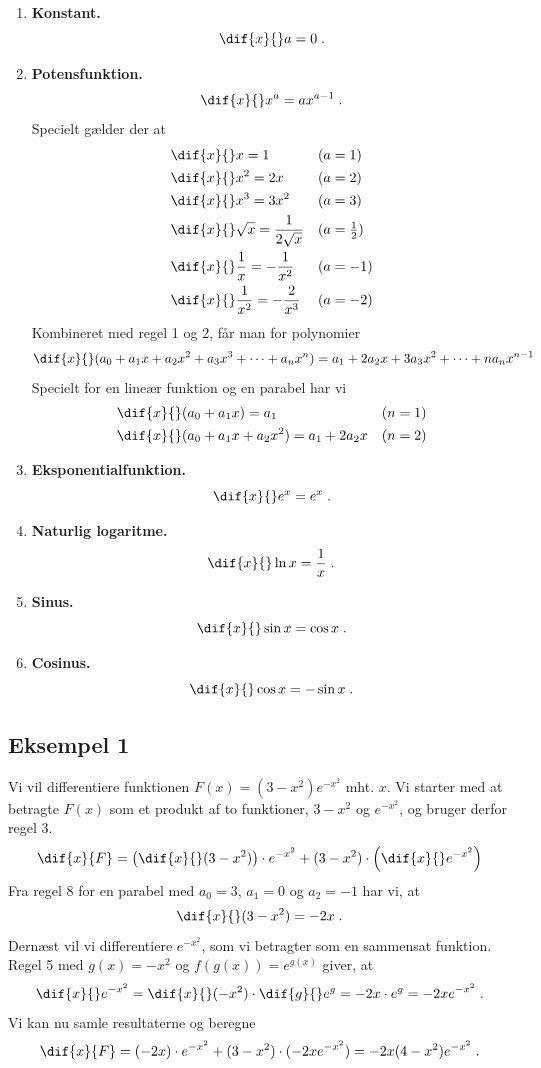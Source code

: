 \begin{enumerate}[resume]
	\item\label{itm:d-konstant} \textbf{Konstant.}\\
	\[
	\dif{x}{}a = 0 \; .
	\]
	\item\label{itm:d-potens} \textbf{Potensfunktion.}\\
	\[
	\dif{x}{} x^a = a x^{a-1} \; .
	\]
	Specielt gælder der at
	\begin{align*}
	&\dif{x}{}x = 1 &&(a=1)\\
	&\dif{x}{}x^2 = 2 x &&(a=2)\\
	&\dif{x}{}x^3 = 3 x^2 &&(a=3)\\
	&\dif{x}{}\sqrt{x} = \frac{1}{2\sqrt{x}} &&(a=\tfrac{1}{2})\\
	&\dif{x}{} \frac{1}{x} = - \frac{1}{x^2} &&(a=-1)\\
	&\dif{x}{} \frac{1}{x^2} = - \frac{2}{x^3} &&(a=-2)
	\end{align*}
	Kombineret med regel 1 og 2, får man for polynomier
	\[
	\dif{x}{} (a_0 + a_1 x + a_2 x^2 + a_3 x^3 + \dots + a_n x^n)
	= a_1 + 2a_2 x + 3a_3 x^2 + \dots + na_n x^{n-1}
	\]
	Specielt for en lineær funktion og en parabel har vi
	\begin{align*}
	&\dif{ x }{} (a_0 + a_1 x) = a_1 && (n=1)\\
	&\dif{ x }{} (a_0 + a_1 x + a_2 x^2) = a_1 + 2a_2 x && (n=2)
	\end{align*}
	\item\label{itm:d-exp} \textbf{Eksponentialfunktion.}\\
	\[
	\dif{x}{}e^x = e^x \; .
	\]
	\item\label{itm:d-ln} \textbf{Naturlig logaritme.}\\
	\[
	\dif{x}{} \ln x = \frac{1}{x} \; .
	\]
	\item\label{itm:d-sin} \textbf{Sinus.}\\
	\[
	\dif{x}{} \sin x = \cos x \; .
	\]
	\item\label{itm:d-cos} \textbf{Cosinus.}\\
	\[
	\dif{x}{} \cos x = - \sin x \; .
	\]
\end{enumerate}

\subsection{Eksempel 1}
Vi vil differentiere funktionen $F(x) = (3 - x^2) e^{-x^2}$
mht. $x$. Vi starter med at betragte $F(x)$ som et produkt af to
funktioner, $3-x^2$ og $e^{-x^2}$, og bruger derfor regel 3.
\[
\dif{x}{F} =
\left(\dif{x}{}(3-x^2)\right) \cdot e^{-x^2}
+ (3-x^2) \cdot \left(\dif{x}{} e^{-x^2}\right)
\]
Fra regel 8 for en parabel med $a_0 = 3$, $a_1 = 0$ og $a_2 = -1$ har vi, at
\[
\dif{x}{} (3-x^2) = -2x \; .
\]
Dernæst vil vi differentiere $e^{-x^2}$, som vi betragter som en
sammensat funktion. Regel 5 med $g(x) = -x^2$ og $f(g(x)) = e^{g(x)}$
giver, at
\[
\dif{x}{} e^{-x^2} = \dif{x}{} (-x^2) \cdot \dif{g}{} e^g
= -2x \cdot e^g
= -2x e^{-x^2} \; .
\]
Vi kan nu samle resultaterne og beregne
\[
\dif{x}{F} = (-2x) \cdot e^{-x^2} + (3-x^2) \cdot (-2x e^{-x^2})
= -2x(4 - x^2) e^{-x^2} \; .
\]

